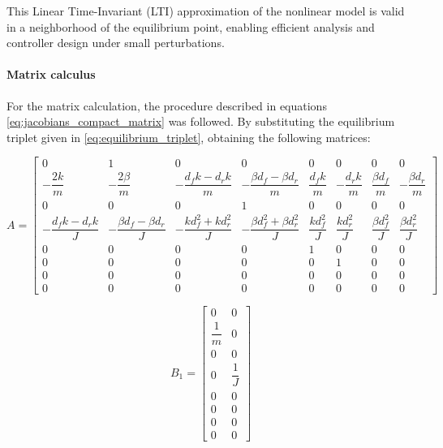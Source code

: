 \documentclass[]{report}
\begin{document}
	
	This Linear Time-Invariant (LTI) approximation of the nonlinear model is valid in a neighborhood of the equilibrium point, enabling efficient analysis and controller design under small perturbations.\\
	
	
	\paragraph{Matrix calculus}
	For the matrix calculation, the procedure described in equations \eqref{eq:jacobians_compact_matrix}  was followed. By substituting the equilibrium triplet given in \eqref{eq:equilibrium_triplet}, obtaining the following matrices:
	
\begin{center}
	\begin{equation}
	A =
	\begin{bmatrix}
		0 & 1 & 0 & 0 & 0 & 0 & 0 & 0 \\
		-\dfrac{2k}{m} & -\dfrac{2\beta}{m} & -\dfrac{d_fk - d_rk}{m} & -\dfrac{\beta d_f - \beta d_r}{m} & \dfrac{d_fk}{m} & -\dfrac{d_rk}{m} & \dfrac{\beta d_f}{m} & -\dfrac{\beta d_r}{m} \\
		0 & 0 & 0 & 1 & 0 & 0 & 0 & 0 \\
		-\dfrac{d_fk - d_rk}{J} & -\dfrac{\beta d_f - \beta d_r}{J} & -\dfrac{k d_f^2 + k d_r^2}{J} & -\dfrac{\beta d_f^2 + \beta d_r^2}{J} & \dfrac{k d_f^2}{J} & \dfrac{k d_r^2}{J} & \dfrac{\beta d_f^2}{J} & \dfrac{\beta d_r^2}{J} \\
		0 & 0 & 0 & 0 & 1 & 0 & 0 & 0 \\
		0 & 0 & 0 & 0 & 0 & 1 & 0 & 0 \\
		0 & 0 & 0 & 0 & 0 & 0 & 0 & 0 \\
		0 & 0 & 0 & 0 & 0 & 0 & 0 & 0
	\end{bmatrix}
\end{equation}
\end{center}

	
\begin{equation}
	B_1 =
	\begin{bmatrix}
		0 & 0 \\
		\dfrac{1}{m} & 0 \\
		0 & 0 \\
		0 & \dfrac{1}{J} \\
		0 & 0 \\
		0 & 0 \\
		0 & 0 \\
		0 & 0
	\end{bmatrix}
\end{equation}
\end{document}
